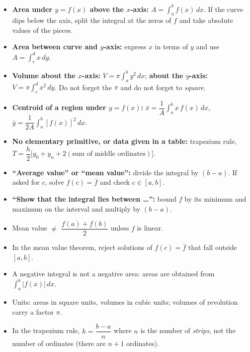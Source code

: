 \documentclass[11pt]{article}
\begin{document}
\begin{aretenir}
\begin{itemize}
\item \textbf{Area under $y=f(x)$ above the $x$-axis:} $\displaystyle A=\int_a^b f(x)\,dx$. If the curve dips below the axis, split the integral at the zeros of $f$ and take absolute values of the pieces.
\item \textbf{Area between curve and $y$-axis:} express $x$ in terms of $y$ and use $\displaystyle A=\int_c^d x\,dy$.
\item \textbf{Volume about the $x$-axis:} $\displaystyle V=\pi\int_a^b y^2\,dx$; \textbf{about the $y$-axis:} $\displaystyle V=\pi\int_c^d x^2\,dy$. Do not forget the $\pi$ and do not forget to \emph{square}.
\item \textbf{Centroid of a region under $y=f(x)$:} $\bar{x} = \dfrac{1}{A}\displaystyle\int_a^b x\,f(x)\,dx$, $\bar{y} = \dfrac{1}{2A}\displaystyle\int_a^b [f(x)]^2\,dx$.
\item \textbf{No elementary primitive, or data given in a table:} trapezium rule, $T = \dfrac{h}{2}\big[y_0 + y_n + 2(\text{sum of middle ordinates})\big]$.
\item \textbf{``Average value'' or ``mean value'':} divide the integral by $(b-a)$. If asked for $c$, solve $f(c)=\bar{f}$ and check $c\in[a,b]$.
\item \textbf{``Show that the integral lies between \dots'':} bound $f$ by its minimum and maximum on the interval and multiply by $(b-a)$.
\end{itemize}
\end{aretenir}

\begin{attention}
\begin{itemize}
\item Mean value $\neq$ $\dfrac{f(a)+f(b)}{2}$ unless $f$ is linear.
\item In the mean value theorem, reject solutions of $f(c)=\bar{f}$ that fall outside $[a,b]$.
\item A negative integral is not a negative area: areas are obtained from $\displaystyle\int_a^b |f(x)|\,dx$.
\item Units: areas in square units, volumes in cubic units; volumes of revolution carry a factor $\pi$.
\item In the trapezium rule, $h = \dfrac{b-a}{n}$ where $n$ is the number of \emph{strips}, not the number of ordinates (there are $n+1$ ordinates).
\end{itemize}
\end{attention}
\end{document}
